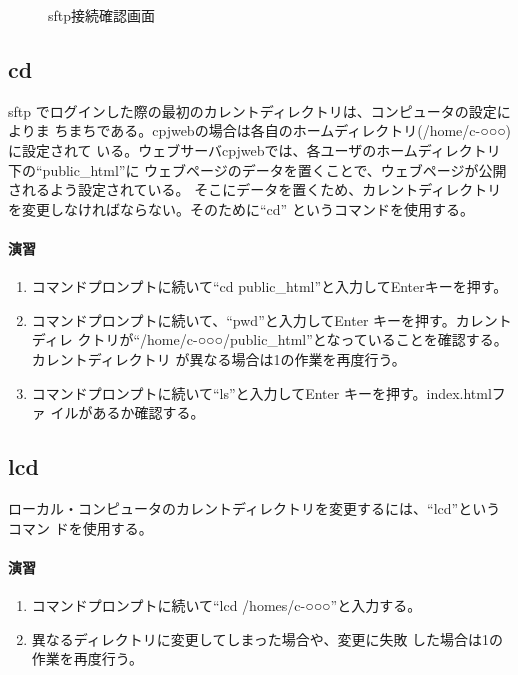 \begin{figure}[htbp]
\begin{center}
\caption{sftp接続確認画面}
\label{fig:ssh1}
\end{center}
\end{figure}

\subsection{cd}
sftp でログインした際の最初のカレントディレクトリは、コンピュータの設定によりま
ちまちである。cpjwebの場合は各自のホームディレクトリ(/home/c-○○○)に設定されて
いる。ウェブサーバcpjwebでは、各ユーザのホームディレクトリ下の``public\_html''に
ウェブページのデータを置くことで、ウェブページが公開されるよう設定されている。
そこにデータを置くため、カレントディレクトリを変更しなければならない。そのために``cd''
というコマンドを使用する。

\paragraph{演習}
\begin{enumerate}
\item コマンドプロンプトに続いて``cd  public\_html''と入力してEnterキーを押す。
\item コマンドプロンプトに続いて、``pwd''と入力してEnter キーを押す。カレントディレ
      クトリが``/home/c-○○○/public\_html''となっていることを確認する。カレントディレクトリ
      が異なる場合は1の作業を再度行う。
\item コマンドプロンプトに続いて``ls''と入力してEnter キーを押す。index.htmlファ
      イルがあるか確認する。
\end{enumerate}

\subsection{lcd}
ローカル・コンピュータのカレントディレクトリを変更するには、``lcd''というコマン
ドを使用する。

\paragraph{演習}
\begin{enumerate}
\item コマンドプロンプトに続いて``lcd  /homes/c-○○○''と入力する。
\item 異なるディレクトリに変更してしまった場合や、変更に失敗
      した場合は1の作業を再度行う。
\end{enumerate}

